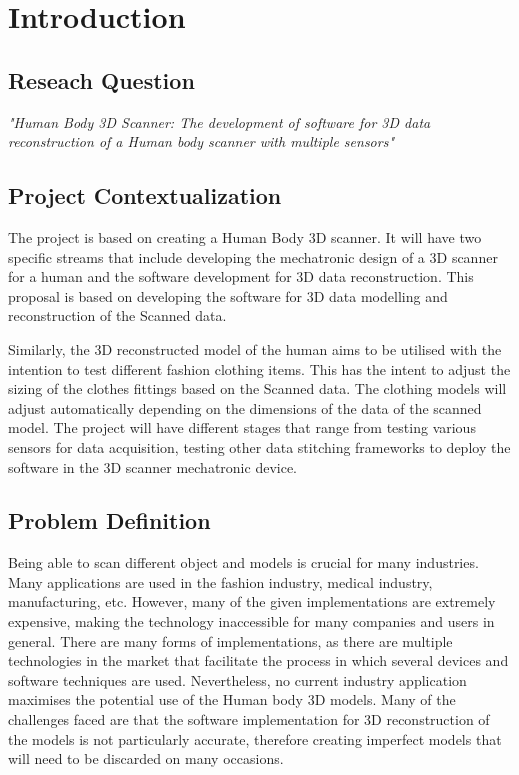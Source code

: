 \documentclass[12pt]{report}
\begin{document}
\newpage
\setcounter{page}{1}

\chapter{Introduction}

\section{Reseach Question}
\textit{\large{"Human Body 3D Scanner: The development of software for 3D data reconstruction of a Human body scanner with multiple sensors" }}

\section{Project Contextualization}
The project is based on creating a Human Body 3D scanner.
It will have two specific streams that include developing the mechatronic design of a 3D scanner for a human and the software development for 3D data reconstruction. 
This proposal is based on developing the software for 3D data modelling and reconstruction of the Scanned data.

Similarly,  the 3D reconstructed model of the human aims to be utilised with the intention to test different fashion clothing items. This has the intent to adjust the sizing of the clothes fittings based on the Scanned data. The clothing models will adjust automatically depending on the dimensions of the data of the scanned model. 
The project will have different stages that range from testing various sensors for data acquisition, testing other data stitching frameworks to deploy the software in the 3D scanner mechatronic device.

\section{Problem Definition}
Being able to scan different object and models is crucial for many industries. Many applications are used in the fashion industry, medical industry, manufacturing, etc. However, many of the given implementations are extremely expensive,  making the technology inaccessible for many companies and users in general. 
There are many forms of implementations, as there are multiple technologies in the market that facilitate the process in which several devices and software techniques are used. Nevertheless,  no current industry application maximises the potential use of the Human body 3D models.
Many of the challenges faced are that the software implementation for 3D reconstruction of the models is not particularly accurate, therefore creating imperfect models that will need to be discarded on many occasions.
\end{document}
